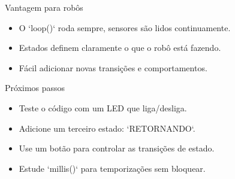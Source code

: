 \documentclass[10pt]{beamer}
\begin{document}
\begin{frame}{Vantagem para robôs}
  \begin{itemize}
    \item O `loop()` roda sempre, sensores são lidos continuamente.
    \item Estados definem claramente o que o robô está fazendo.
    \item Fácil adicionar novas transições e comportamentos.
  \end{itemize}
\end{frame}

\begin{frame}{Próximos passos}
  \begin{itemize}
    \item Teste o código com um LED que liga/desliga.
    \item Adicione um terceiro estado: `RETORNANDO`.
    \item Use um botão para controlar as transições de estado.
    \item Estude `millis()` para temporizações sem bloquear.
  \end{itemize}
\end{frame}
\end{document}
